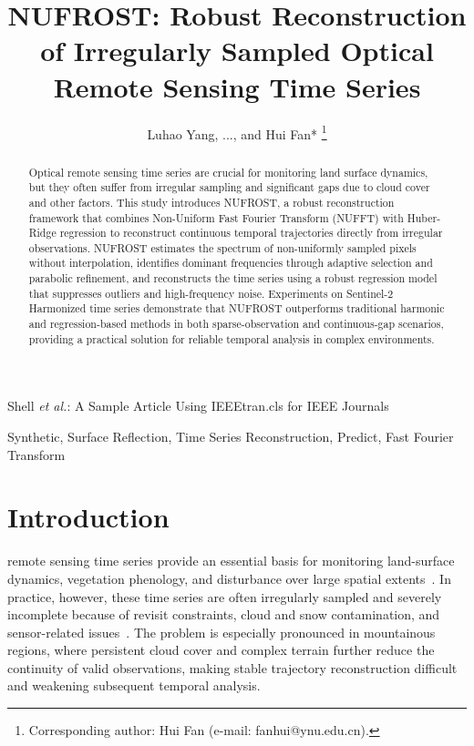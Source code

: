 \documentclass[letterpaper,journal]{IEEEtran}
\begin{document}
\title{NUFROST: Robust Reconstruction of Irregularly Sampled Optical Remote Sensing Time Series}

\author{Luhao Yang, ..., and Hui Fan*%
\thanks{Corresponding author: Hui Fan (e-mail: fanhui@ynu.edu.cn).}%
}

%
{Shell \MakeLowercase{\textit{et al.}}: A Sample Article Using IEEEtran.cls for IEEE Journals}


\maketitle

\begin{abstract}
Optical remote sensing time series are crucial for monitoring land surface dynamics, but they often suffer from irregular sampling and significant gaps due to cloud cover and other factors. This study introduces NUFROST, a robust reconstruction framework that combines Non-Uniform Fast Fourier Transform (NUFFT) with Huber-Ridge regression to reconstruct continuous temporal trajectories directly from irregular observations. NUFROST estimates the spectrum of non-uniformly sampled pixels without interpolation, identifies dominant frequencies through adaptive selection and parabolic refinement, and reconstructs the time series using a robust regression model that suppresses outliers and high-frequency noise. Experiments on Sentinel-2 Harmonized time series demonstrate that NUFROST outperforms traditional harmonic and regression-based methods in both sparse-observation and continuous-gap scenarios, providing a practical solution for reliable temporal analysis in complex environments.
\end{abstract}

\begin{IEEEkeywords}
Synthetic, Surface Reflection, Time Series Reconstruction, Predict, Fast Fourier Transform
\end{IEEEkeywords}

\section{Introduction}
 remote sensing time series provide an essential basis for monitoring land-surface dynamics, vegetation phenology, and disturbance over large spatial extents~\cite{ref1,ref2}. In practice, however, these time series are often irregularly sampled and severely incomplete because of revisit constraints, cloud and snow contamination, and sensor-related issues~\cite{ref2,ref3}. The problem is especially pronounced in mountainous regions, where persistent cloud cover and complex terrain further reduce the continuity of valid observations, making stable trajectory reconstruction difficult and weakening subsequent temporal analysis.
\end{document}
